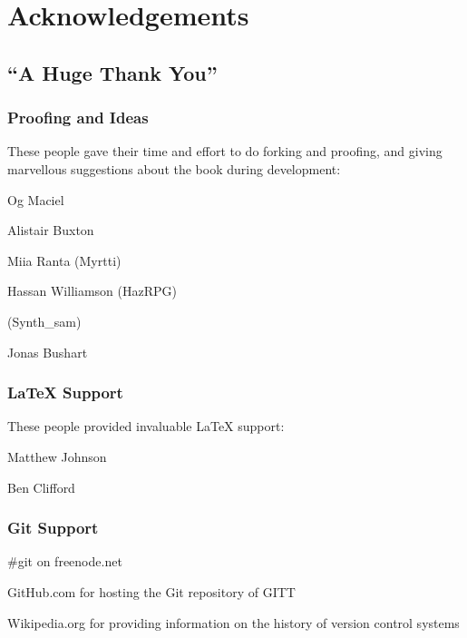 \chapter{Acknowledgements}
\section{``A Huge Thank You''}

\subsection{Proofing and Ideas}
These people gave their time and effort to do forking and proofing, and giving marvellous suggestions about the book during development:

Og Maciel

Alistair Buxton

Miia Ranta (Myrtti)

Hassan Williamson (HazRPG)

(Synth\_sam)

Jonas Bushart

\subsection{\LaTeX{} Support}
These people provided invaluable \LaTeX{} support:

Matthew Johnson

Ben Clifford

\subsection{Git Support}
\#git on freenode.net

GitHub.com for hosting the Git repository of GITT

Wikipedia.org for providing information on the history of version control systems
